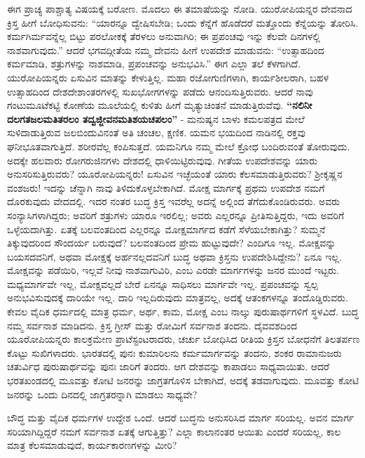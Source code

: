 ಈಗ ಪ್ರಾಚ್ಯ ಪಾಶ್ಚಾತ್ಯ ವಿಷಯಕ್ಕೆ ಬರೋಣ. ಮೊದಲು ಈ ತಮಾಷೆಯನ್ನು ನೋಡಿ. ಯುರೋಪಿಯನ್ನರ ದೇವನಾದ ಕ್ರಿಸ್ತ ಹೀಗೆ ಬೋಧಿಸುವನು: “ಯಾರನ್ನೂ ದ್ವೇಷಿಸಬೇಡಿ; ಒಂದು ಕೆನ್ನೆಗೆ ಹೊಡೆದರೆ ಮತ್ತೊಂದು ಕೆನ್ನೆಯನ್ನು ತೋರಿಸಿ. ಕರ್ಮ\-ಗಿರ್ಮವನ್ನೆಲ್ಲ ಬಿಟ್ಟು ಪರಲೋಕಕ್ಕೆ ತೆರಳಲು ಅನುವಾಗಿರಿ; ಈ ಪ್ರಪಂಚವು ಇನ್ನು ಕೆಲವೇ ದಿನಗಳಲ್ಲಿ ನಾಶವಾಗುವುದು.” ಆದರೆ ಭಗವದ್ಗೀತೆಯ ನಮ್ಮ ದೇವನು ಹೀಗೆ ಉಪದೇಶ ಮಾಡುವನು: “ಉತ್ಸಾಹದಿಂದ ಕರ್ಮಮಾಡಿ, ಶತ್ರುಗಳನ್ನು ನಾಶಮಾಡಿ, ಪ್ರಪಂಚವನ್ನು ಅನುಭವಿಸಿ.” ಈಗ ಎಲ್ಲಾ ತಲೆ ಕೆಳಗಾಗಿದೆ. ಯುರೋಪಿಯನ್ನರು ಏಸುವಿನ ಮಾತನ್ನು ಕೇಳುತ್ತಿಲ್ಲ. ಮಹಾ ರಜೋಗುಣಿಗಳಾಗಿ, ಕಾರ್ಯಶೀಲರಾಗಿ, ಬಹಳ ಉತ್ಸಾಹದಿಂದ ದೇಶದೇಶಾಂತರಗಳಲ್ಲಿ ಸುಖಭೋಗಗಳನ್ನು ಪಡೆದು ಆನಂದಿಸುತ್ತಿರುವರು. ಆದರೆ ನಾವು ಗಂಟುಮೂಟೆಕಟ್ಟಿ ಕೋಣೆಯ ಮೂಲೆಯಲ್ಲಿ ಕುಳಿತು ಹೀಗೆ ಮೃತ್ಯುಚಿಂತನೆ ಮಾಡುತ್ತಿರುವೆವು. \textbf{“ನಲಿನೀ ದಲಗತಜಲಮತಿತರಲಂ ತದ್ವಜ್ಜೀವನಮತಿಶಯಚಪಲಂ”} - ಮನುಷ್ಯನ ಬಾಳು ಕಮಲಪತ್ರದ ಮೇಲೆ ಸುಳಿದಾಡುತ್ತಿರುವ ಜಲಬಿಂದುವಿನಂತೆ ಅತಿ ಚಂಚಲ, ಕ್ಷಣಿಕ. ಯಮನ ಭಯದಿಂದ ನಾಡಿನಲ್ಲಿ ರಕ್ತವು ಘನೀಭೂತವಾಗುತ್ತಿದೆ. ಶರೀರವೆಲ್ಲ ಕಂಪಿಸುತ್ತದೆ. ಯಮನಿಗೂ ನಮ್ಮ ಮೇಲೆ ಕ್ರೋಧ ಬಂದಿರುವಂತೆ ತೋರುವುದು. ಅದಕ್ಕೇ ಹಲವಾರು ರೋಗರುಜಿನಗಳು ದೇಶದಲ್ಲಿ ಧಾಳಿಯಿಟ್ಟಿರುವುವು. ಗೀತೆಯ ಉಪದೇಶವನ್ನು ಯಾರು ಅನುಸರಿಸುತ್ತಿರುವರು? ಯೂರೋಪಿಯನ್ನರು! ಏಸುವಿನ ಇಚ್ಛೆಯಂತೆ ಯಾರು ಕೆಲಸಮಾಡುತ್ತಿರುವರು? ಶ‍್ರೀಕೃಷ್ಣನ ವಂಶಜರು! ಇದನ್ನು ಚೆನ್ನಾಗಿ ನಾವು ತಿಳಿದುಕೊಳ್ಳಬೇಕಾಗಿದೆ. ಮೋಕ್ಷ ಮಾರ್ಗಕ್ಕೆ ಪ್ರಥಮ ಉಪದೇಶ ನಮಗೆ ದೊರಕುವುದು ವೇದದಲ್ಲಿ. ಇದರ ನಂತರ ಬುದ್ಧ ಕ್ರಿಸ್ತ ಇವರೆಲ್ಲ ಅದನ್ನೆ ಅಲ್ಲಿಂದ ತೆಗೆದುಕೊಂಡಿರುವರು. ಅವರು ಸಂನ್ಯಾಸಿಗಳಾಗಿದ್ದರು; ಅವರಿಗೆ ಶತ್ರುಗಳು ಯಾರೂ ಇರಲಿಲ್ಲ; ಅವರು ಎಲ್ಲರನ್ನೂ ಪ್ರೀತಿಸುತ್ತಿದ್ದರು, ಇದು ಅವರಿಗೆ ಒಳ್ಳೆಯದಾಗಿತ್ತು. ಏತಕ್ಕೆ ಬಲವಂತದಿಂದ ಎಲ್ಲರನ್ನೂ ಮೋಕ್ಷಮಾರ್ಗದ ಕಡೆಗೆ ಸೆಳೆಯಬೇಕಾಗಿತ್ತು? ಸುಮ್ಮನೆ ತಿಕ್ಕುವುದರಿಂದ ಸೌಂದರ್ಯ ಬರುವುದೆ? ಬಲವಂತದಿಂದ ಪ್ರೇಮ ಹುಟ್ಟುವುದೇ? ಎಂದಿಗೂ ಇಲ್ಲ. ಮೋಕ್ಷವನ್ನು ಬಯಸದವನಿಗೆ, ಅಥವಾ ಮೋಕ್ಷಕ್ಕೆ ಅರ್ಹನಲ್ಲದವನಿಗೆ ಬುದ್ಧ ಅಥವಾ ಕ್ರಿಸ್ತನು ಉಪದೇಶಿಸಿದ್ದೇನು? ಏನೂ ಇಲ್ಲ. ಮೋಕ್ಷವನ್ನು ಪಡೆಯಿರಿ, ಇಲ್ಲವೆ ನೀವು ನಾಶವಾಗುವಿರಿ, ಎಂಬ ಎರಡೇ ಮಾರ್ಗಗಳನ್ನು ಜನರ ಮುಂದೆ ಇಟ್ಟರು. ಮಧ್ಯಮಾರ್ಗವೇ ಇಲ್ಲ, ಮೋಕ್ಷವಲ್ಲದೆ ಬೇರೆ ಏನನ್ನೂ ಸಾಧಿಸಲು ಮಾರ್ಗವೇ ಇಲ್ಲ. ಪ್ರಪಂಚವನ್ನು ಸ್ವಲ್ಪ ಅನುಭವಿಸುವುದಕ್ಕೆ ದಾರಿಯೇ ಇಲ್ಲ. ದಾರಿ ಇಲ್ಲದಿರುವುದು ಮಾತ್ರವಲ್ಲ, ಅದಕ್ಕೆ ಆತಂಕಗಳನ್ನೂ ತಂದೊಡ್ಡಿರುವರು. ಕೇವಲ ವೈದಿಕ ಧರ್ಮದಲ್ಲಿ ಮಾತ್ರ ಧರ್ಮ, ಅರ್ಥ, ಕಾಮ, ಮೋಕ್ಷ ಎಂಬ ನಾಲ್ಕು ಪುರುಷಾರ್ಥಗಳಿಗೆ ಸ್ಥಳವಿದೆ. ಬುದ್ಧ ನಮ್ಮ ಸರ್ವನಾಶ ಮಾಡಿದನು. ಕ್ರಿಸ್ತ ಗ್ರೀಸ್​ ಮತ್ತು ರೋಮಿಗೆ ಸರ್ವನಾಶ ತಂದನು. ದೈವವಶದಿಂದ ಯೂರೋಪಿಯನ್ನರು ಕಾಲಕ್ರಮೇಣ ಪ್ರಾಟೆಸ್ಟಂಟರಾದರು, ಚರ್ಚು ಬೋಧಿಸಿದ ರೀತಿಯ ಕ್ರಿಸ್ತನ ಬೋಧನೆಗೆ ತಿಲತರ್ಪಣ ಕೊಟ್ಟು ಸುಖಿಗಳಾದರು. ಭಾರತದಲ್ಲಿ ಪುನಃ ಕುಮಾರಿಲನು ಕರ್ಮಮಾರ್ಗವನ್ನು ತಂದನು, ಶಂಕರ ರಾಮಾನುಜರು ಚತುರ್ವಿಧ ಪುರುಷಾರ್ಥವನ್ನು ಪುನಃ ಜಾರಿಗೆ ತಂದರು. ಆಗ ದೇಶವನ್ನು ಕಾಪಾಡಲು ಸಾಧ್ಯವಾಯಿತು. ಆದರೆ ಭರತಖಂಡದಲ್ಲಿ ಮೂವತ್ತು ಕೋಟಿ ಜನರನ್ನು ಜಾಗ್ರತಗೊಳಿಸ ಬೇಕಾಗಿದೆ, ಅದಕ್ಕೆ ತಡವಾಗು\-ವುದು. ಮೂವತ್ತು ಕೋಟಿ ಜನರನ್ನು ಒಂದು ದಿನದಲ್ಲಿ ಜಾಗ್ರತರನ್ನಾಗಿ ಮಾಡಲು ಸಾಧ್ಯವೇ?

ಬೌದ್ಧ ಮತ್ತು ವೈದಿಕ ಧರ್ಮಗಳ ಉದ್ದೇಶ ಒಂದೆ. ಆದರೆ ಬುದ್ಧನು ಅನುಸರಿಸಿದ ಮಾರ್ಗ ಸರಿಯಲ್ಲ. ಅವನ ಮಾರ್ಗ ಸರಿಯಾಗಿದ್ದಿದ್ದರೆ ನಮಗೆ ಸರ್ವನಾಶ ಏತಕ್ಕೆ ಆಗುತ್ತಿತ್ತು? ಎಲ್ಲಾ ಕಾಲಾನಂತರ ಆಯಿತು ಎಂದರೆ ಸರಿಯಲ್ಲ, ಕಾಲ ಮಾತ್ರ ಕೆಲಸಮಾಡು\break ವುದೆ, ಕಾರ್ಯಕಾರಣಗಳನ್ನು ಮೀರಿ?

